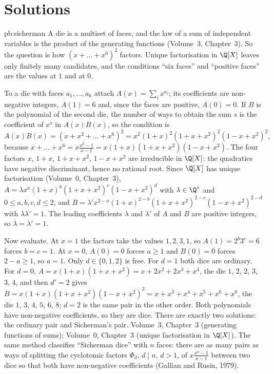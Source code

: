 \section{Solutions}

\begin{solution}{pb:sicherman}
\idea A die is a multiset of faces, and the law of a sum of independent variables is the product of the generating functions
(Volume~3, Chapter~3). So the question is how $(x+\dots+x^6)^2$ factors. Unique factorisation in $\Q[X]$ leaves only finitely
many candidates, and the conditions ``six faces'' and ``positive faces'' are the values at $1$ and at $0$.

\writeup To a die with faces $a_1,\dots,a_6$ attach $A(x)=\sum_ix^{a_i}$; its coefficients are non-negative integers,
$A(1)=6$ and, since the faces are positive, $A(0)=0$. If $B$ is the polynomial of the second die, the number of ways to obtain
the sum $s$ is the coefficient of $x^s$ in $A(x)B(x)$, so the condition is
\[
A(x)B(x)=(x+x^2+\dots+x^6)^2=x^2(1+x)^2(1+x+x^2)^2(1-x+x^2)^2,
\]
because $x+\dots+x^6=x\frac{x^6-1}{x-1}=x(1+x)(1+x+x^2)(1-x+x^2)$. The four factors $x$, $1+x$, $1+x+x^2$, $1-x+x^2$ are
irreducible in $\Q[X]$: the quadratics have negative discriminant, hence no rational root. Since $\Q[X]$ has unique
factorisation (Volume~0, Chapter~3), $A=\lambda x^a(1+x)^b(1+x+x^2)^c(1-x+x^2)^d$ with $\lambda\in\Q^*$ and $0\le a,b,c,d\le2$,
and $B=\lambda'x^{2-a}(1+x)^{2-b}(1+x+x^2)^{2-c}(1-x+x^2)^{2-d}$ with $\lambda\lambda'=1$. The leading coefficients $\lambda$
and $\lambda'$ of $A$ and $B$ are positive integers, so $\lambda=\lambda'=1$.

Now evaluate. At $x=1$ the factors take the values $1,2,3,1$, so $A(1)=2^b3^c=6$ forces $b=c=1$. At $x=0$, $A(0)=0$ forces
$a\ge1$ and $B(0)=0$ forces $2-a\ge1$, so $a=1$. Only $d\in\{0,1,2\}$ is free. For $d=1$ both dice are ordinary. For $d=0$,
$A=x(1+x)(1+x+x^2)=x+2x^2+2x^3+x^4$, the die $1$, $2$, $2$, $3$, $3$, $4$, and then $d'=2$ gives
$B=x(1+x)(1+x+x^2)(1-x+x^2)^2=x+x^3+x^4+x^5+x^6+x^8$, the die $1$, $3$, $4$, $5$, $6$, $8$; $d=2$ is the same pair in the other order. Both
polynomials have non-negative coefficients, so they are dice. There are exactly two solutions: the ordinary pair and
Sicherman's pair.
\tools Volume~3, Chapter~3 (generating functions of sums); Volume~0, Chapter~3 (unique factorisation in $\Q[X]$).
\leads The same method classifies ``Sicherman dice'' with $n$ faces: there are as many pairs as ways of splitting the
cyclotomic factors $\Phi_d$, $d\mid n$, $d>1$, of $x\frac{x^n-1}{x-1}$ between two dice so that both have non-negative
coefficients (Gallian and Rusin, 1979).
\end{solution}

